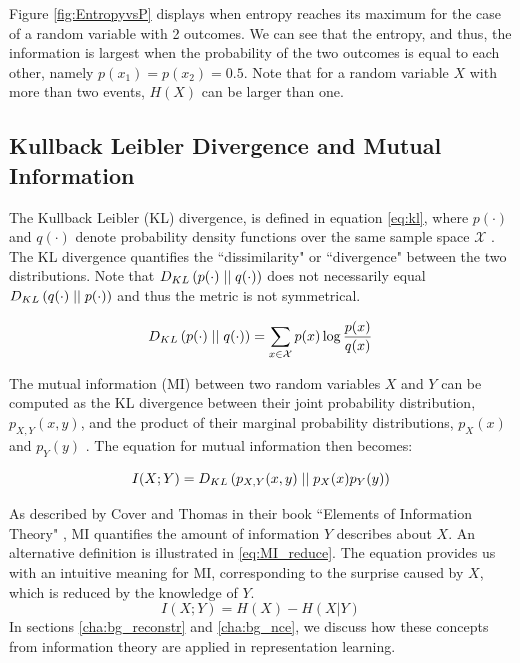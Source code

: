 	
	
	Figure \ref{fig:EntropyvsP} displays when entropy reaches its maximum for the case of a random variable with 2 outcomes. We can see that the entropy, and thus, the information is largest when the probability of the two outcomes is equal to each other, namely $p(x_1)=p(x_2)=0.5$. Note that for a random variable $X$ with more than two events, $H(X)$ can be larger than one.
	
	\subsection{Kullback Leibler Divergence and Mutual Information} \label{cha:rel_entrop}
	The Kullback Leibler (KL) divergence, is defined in equation \ref{eq:kl}, where $p(\cdot)$ and $q(\cdot)$ denote probability density functions over the same sample space $\mathcal{X}$ \citep{coverElementsInformationTheory2006}. The KL divergence quantifies the ``dissimilarity" or ``divergence" between the two distributions. Note that $D_{KL} \left( p(\cdot) \mid \mid q(\cdot) \right)$ does not necessarily equal $D_{KL} \left( q(\cdot) \mid \mid p(\cdot) \right)$ and thus the metric is not symmetrical.
	
	\begin{equation}
		D_{KL} \left( p(\cdot) \mid \mid q(\cdot) \right) = \sum_{x\in\mathcal{X}}p(x) \log \frac{p(x)}{q(x)} \label{eq:kl}
	\end{equation}
	
	
	
	The mutual information (MI) between two random variables $X$ and $Y$ can be computed as the KL divergence between their joint probability distribution, $p_{X,Y}(x,y)$, and the product of their marginal probability distributions, $p_X(x)$ and $p_Y(y)$ \citep{coverElementsInformationTheory2006}. The equation for mutual information then becomes:
	
	\begin{equation}
		I(X; Y) =  D_{KL} \left( p_{X, Y}(x, y) \mid \mid p_X(x) p_Y(y) \right)
	\end{equation}
	
	As described by Cover and Thomas in their book ``Elements of Information Theory" \citep{coverElementsInformationTheory2006}, MI quantifies the amount of information $Y$ describes about $X$. An alternative definition is illustrated in \ref{eq:MI_reduce}. The equation provides us with an intuitive meaning for MI, corresponding to the surprise caused by $X$, which is reduced by the knowledge of $Y$. 
	\begin{equation}
		I(X;Y)= H(X) - H(X|Y) \label{eq:MI_reduce}
	\end{equation}
	In sections \ref{cha:bg_reconstr} and \ref{cha:bg_nce}, we discuss how these concepts from information theory are applied in representation learning.
		
